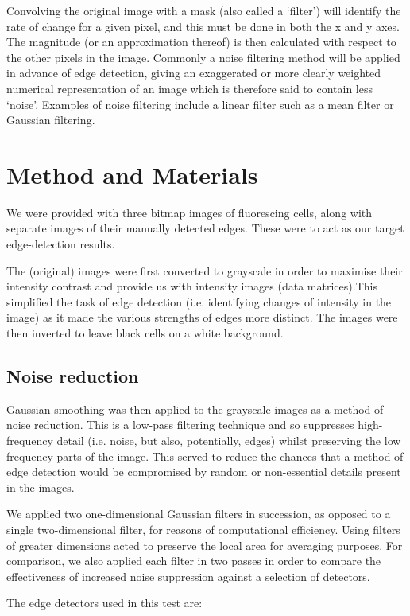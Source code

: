 \documentclass[a4paper]{article}
\begin{document}
\begin{multicols*}{2}
Convolving the original image with a mask (also called a ‘filter’) will identify the rate of change for a given pixel, and this must be done in both the x and y axes. The magnitude (or an approximation thereof) is then calculated with respect to the other pixels in the image. Commonly a noise filtering method will be applied in advance of edge detection, giving an exaggerated or more clearly weighted numerical representation of an image which is therefore said to contain less ‘noise’. Examples of noise filtering include a linear filter such as a mean filter or Gaussian filtering.

\section*{Method and Materials}

We were provided with three bitmap images of fluorescing cells, along with separate images of their manually detected edges. These were to act as our target edge-detection results.

The (original) images were first converted to grayscale in order to maximise their intensity contrast and provide us with intensity images (data matrices).This simplified the task of edge detection (i.e. identifying changes of intensity in the image) as it made the various strengths of edges more distinct. The images were then inverted to leave black cells on a white background. 
\subsection*{Noise reduction}

Gaussian smoothing was then applied to the grayscale images as a method of noise reduction. This is a low-pass filtering technique and so suppresses high-frequency detail (i.e. noise, but also, potentially, edges) whilst preserving the low frequency parts of the image. This served to reduce the chances that a method of edge detection would be compromised by random or non-essential details present in the images.

We applied two one-dimensional Gaussian filters in succession, as opposed to a single two-dimensional filter, for reasons of computational efficiency. Using filters of greater dimensions acted to preserve the local area for averaging purposes. For comparison, we also applied each filter in two passes in order to compare the effectiveness of increased noise suppression against a selection of detectors.

The edge detectors used in this test are:


\end{multicols*}
\end{document}

